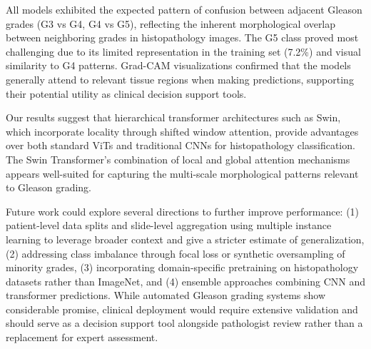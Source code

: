 \documentclass[conference]{IEEEtran}
\begin{document}
All models exhibited the expected pattern of confusion between adjacent Gleason grades (G3 vs G4, G4 vs G5), reflecting the inherent morphological overlap between neighboring grades in histopathology images. The G5 class proved most challenging due to its limited representation in the training set (7.2\%) and visual similarity to G4 patterns. Grad-CAM visualizations confirmed that the models generally attend to relevant tissue regions when making predictions, supporting their potential utility as clinical decision support tools.

Our results suggest that hierarchical transformer architectures such as Swin, which incorporate locality through shifted window attention, provide advantages over both standard ViTs and traditional CNNs for histopathology classification. The Swin Transformer's combination of local and global attention mechanisms appears well-suited for capturing the multi-scale morphological patterns relevant to Gleason grading.

Future work could explore several directions to further improve performance: (1) patient-level data splits and slide-level aggregation using multiple instance learning to leverage broader context and give a stricter estimate of generalization, (2) addressing class imbalance through focal loss or synthetic oversampling of minority grades, (3) incorporating domain-specific pretraining on histopathology datasets rather than ImageNet, and (4) ensemble approaches combining CNN and transformer predictions. While automated Gleason grading systems show considerable promise, clinical deployment would require extensive validation and should serve as a decision support tool alongside pathologist review rather than a replacement for expert assessment.





\nocite{*}
\end{document}
